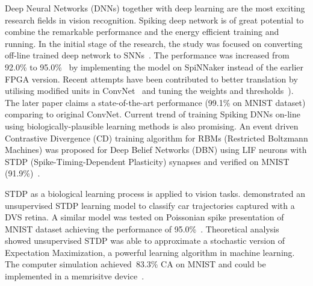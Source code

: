 Deep Neural Networks (DNNs) together with deep learning are the most exciting research fields in vision recognition.
Spiking deep network is of great potential to combine the remarkable performance and the energy efficient training and running.
In the initial stage of the research, the study was focused on converting off-line trained deep network to SNNs~\citep{o2013real}.
The performance was increased from 92.0\% to 95.0\%~\citep{Stromatias2015scalable} by implementing the model on SpiNNaker instead of the earlier FPGA version.
Recent attempts have been contributed to better translation by utilising modified units in ConvNet~\citep{cao2015spiking} and tuning the weights and thresholds~\citep{Diehl2015fast}).
The later paper claims a state-of-the-art performance (99.1\% on MNIST dataset) comparing to original ConvNet.
Current trend of training Spiking DNNs on-line using biologically-plausible learning methods is also promising.
An event driven Contrastive Divergence (CD) training algorithm for RBMs (Restricted Boltzmann Machines) was proposed for Deep Belief Networks (DBN) using LIF neurons with STDP (Spike-Timing-Dependent Plasticity) synapses and verified on MNIST (91.9\%)~\citep{neftci2013event}.

STDP as a biological learning process is applied to vision tasks.
\cite{bichler2012extraction} demonstrated an unsupervised STDP learning model to classify car trajectories captured with a DVS retina. 
A similar model was tested on Poissonian spike presentation of MNIST dataset achieving the performance of 95.0\%~\citep{Diehl2015unsupervised}.
Theoretical analysis~\citep{nessler2013bayesian} showed unsupervised STDP was able to approximate a stochastic version of Expectation Maximization, a powerful learning algorithm in machine learning.
The computer simulation achieved~83.3\% CA on MNIST and could be implemented in a memrisitve device~\citep{bill2014compound}. 

